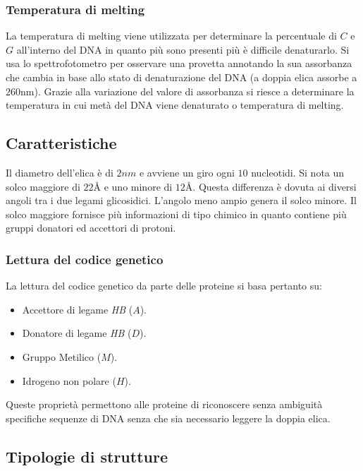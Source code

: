 		\subsubsection{Temperatura di melting}
		La temperatura di melting viene utilizzata per determinare la percentuale di $C$ e $G$ all'interno del DNA in quanto pi\`u sono presenti pi\`u \`e difficile denaturarlo. 
		Si usa lo spettrofotometro per osservare una provetta annotando la sua assorbanza che cambia in base allo stato di denaturazione del DNA (a doppia elica assorbe a $260\si{\nano\metre}$). 
		Grazie alla variazione del valore di assorbanza si riesce a determinare la temperatura in cui met\`a del DNA viene denaturato o temperatura di melting. 

	\subsection{Caratteristiche}
	Il diametro dell'elica \`e di $2\si{nm}$ e avviene un giro ogni $10$ nucleotidi.
	Si nota un solco maggiore di $22\si{\angstrom}$ e uno minore di $12\si{\angstrom}$.
	Questa differenza \`e dovuta ai diversi angoli tra i due legami glicosidici.
	L'angolo meno ampio genera il solco minore.
	Il solco maggiore fornisce pi\`u informazioni di tipo chimico in quanto contiene pi\`u gruppi donatori ed accettori di protoni.

		\subsubsection{Lettura del codice genetico}
		La lettura del codice genetico da parte delle proteine si basa pertanto su:
		\begin{multicols}{2}
			\begin{itemize}
				\item Accettore di legame \emph{HB} ($A$).
				\item Donatore di legame \emph{HB} ($D$).
				\item Gruppo Metilico ($M$).
				\item Idrogeno non polare ($H$).
			\end{itemize}
		\end{multicols}
		Queste propriet\`a permettono alle proteine di riconoscere senza ambiguit\`a specifiche sequenze di DNA senza che sia necessario leggere la doppia elica.
	\subsection{Tipologie di strutture}

